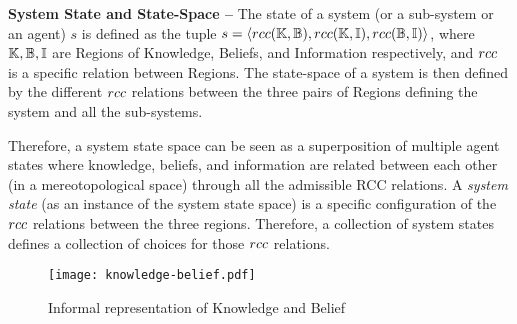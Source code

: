 \begin{definition}{\bf System State and State-Space --}\label{def:system}
	The state of a system (or a sub-system or an agent) $s$ is defined as the tuple 
	$s=\langle rcc(\mathbb{K},\mathbb{B}),rcc(\mathbb{K},\mathbb{I}),rcc(\mathbb{B},\mathbb{I})\rangle$,
	where $\mathbb{K},\mathbb{B},\mathbb{I}$ are Regions
	of Knowledge, Beliefs, and Information respectively, and $rcc$ is a
	specific relation between Regions.  The
	state-space of a system is then defined by the different $rcc$
	relations between the three pairs of Regions defining the system and
	all the sub-systems.
\end{definition}
Therefore, a system state space can be seen as a superposition of multiple agent states where knowledge,
beliefs, and information are related between each other (in a mereotopological
space) through all the admissible RCC relations. 
A \emph{system state} (as an instance of the system state space)
is a specific configuration of
the $rcc$ relations between the three regions. Therefore, a collection of 
system states defines a collection of choices for those $rcc$ relations.


\begin{figure}[t]
	\centering
	\texttt{[image: knowledge-belief.pdf]}
	\caption{Informal representation of Knowledge and Belief}
	\label{fig:knowledge-belief}
\end{figure}


